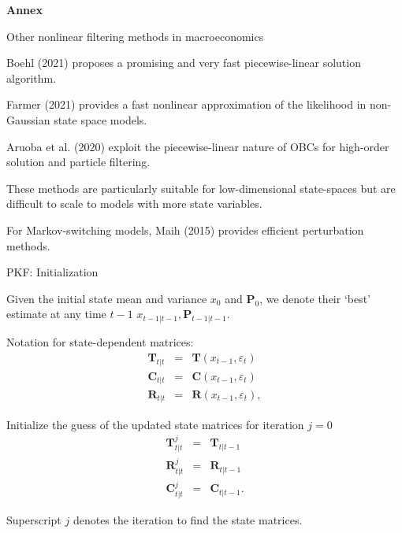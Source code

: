 \begin{frame}
\textbf{Annex}
\end{frame}

\begin{frame}{Other nonlinear filtering methods in macroeconomics}
\label{details_lit}
\begin{wideitemize}
\item Boehl (2021) proposes a promising and very fast piecewise-linear solution algorithm.
\item Farmer (2021) provides a fast nonlinear approximation of the likelihood in non-Gaussian state space
models. 
\item Aruoba et al. (2020) exploit the piecewise-linear nature of OBCs for high-order solution
and particle filtering. 
\item These methods are particularly suitable for low-dimensional state-spaces but are
difficult to scale to models with more state variables.
\item For Markov-switching models, Maih (2015) provides efficient perturbation methods.
\end{wideitemize}
\hyperlink{lit}{}
\end{frame}


\begin{frame}{PKF: Initialization}
\label{details_pkf_init}
\begin{wideitemize}
    \item Given the initial state mean and variance $x_0$ and $\mathbf{P}_0$, we denote their `best' estimate at any time $t-1$ $x_{t-1|t-1}, \mathbf{P}_{t-1|t-1}.$	
    \item Notation for state-dependent matrices: 
    \begin{eqnarray*}
    \mathbf{T}_{t|t}&=& \mathbf{T}(x_{t-1},\varepsilon_{t}) \\
    \mathbf{C}_{t|t}&=& \mathbf{C}(x_{t-1},\varepsilon_{t}) \\
    \mathbf{R}_{t|t} &=& \mathbf{R}(x_{t-1},\varepsilon_{t}),
    \end{eqnarray*}
\item Initialize the guess of the updated state matrices for iteration $j=0$
\begin{eqnarray*}
\mathbf{T}^{j}_{t|t}&=&\mathbf{T}_{t|t-1} \\
\mathbf{R}^{j}_{t|t}&=&\mathbf{R}_{t|t-1} \\
\mathbf{C}^{j}_{t|t}&=&\mathbf{C}_{t|t-1}. 
\end{eqnarray*}
\item Superscript $j$ denotes the iteration to find the state matrices.
\end{wideitemize}
\hyperlink{pkf_init}{}
\end{frame}

